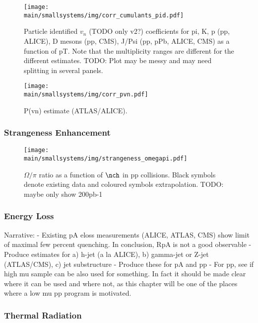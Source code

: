 \documentclass[../report.tex]{subfiles}
\providecommand{\main}{..}
\begin{document}
\begin{figure}[ht]
\centering
\texttt{[image: \\main/smallsystems/img/corr\_cumulants\_pid.pdf]}
\caption{Particle identified $v_n$ (TODO only v2?) coefficients for pi, K, p (pp, ALICE), D mesons (pp, CMS), J/Psi (pp, pPb, ALICE, CMS) as a function of pT. Note that the multiplicity ranges are different for the different estimates. TODO: Plot may be messy and may need splitting in several panels.}
\label{fig:smallsystems_corr_cumulants_pid}
\end{figure}

\begin{figure}[ht]
\centering
\texttt{[image: \\main/smallsystems/img/corr\_pvn.pdf]}
\caption{P(vn) estimate (ATLAS/ALICE).}
\label{fig:smallsystems_corr_pvn}
\end{figure}

\subsubsection{Strangeness Enhancement}

\begin{figure}[ht]
\centering
\texttt{[image: \\main/smallsystems/img/strangeness\_omegapi.pdf]}
\caption{$\Omega/\pi$ ratio as a function of $\nch$ in pp collisions. Black symbols denote existing data \cite{ALICE:2017jyt} and coloured symbols extrapolation. TODO: maybe only show 200pb-1}
\label{fig:smallsystems_strangeness_omega_pi}
\end{figure}

\subsubsection{Energy Loss}

Narrative: 
- Existing pA eloss measurements (ALICE, ATLAS, CMS) show limit of maximal few percent quenching. In conclusion, RpA is not a good observable
- Produce estimates for a) h-jet (a la ALICE), b) gamma-jet or Z-jet (ATLAS/CMS), c) jet substructure
- Produce these for pA and pp
- For pp, see if high mu sample can be also used for something. In fact it should be made clear where it can be used and where not, as this chapter will be one of the places where a low mu pp program is motivated.

\subsubsection{Thermal Radiation}
\end{document}
